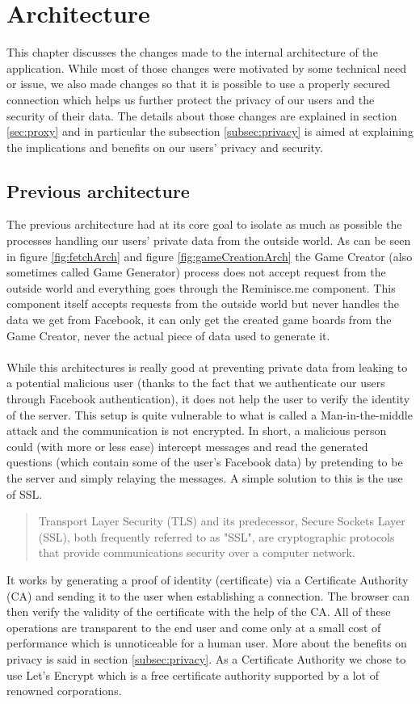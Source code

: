 \chapter{Architecture}
This chapter discusses the changes made to the internal architecture of the application. While most of those changes were motivated by some technical need or issue, we also made changes so that it is possible to use a properly secured connection which helps us further protect the privacy of our users and the security of their data. The details about those changes are explained in section \ref{sec:proxy} and in particular the subsection \ref{subsec:privacy} is aimed at explaining the implications and benefits on our users' privacy and security.
\section{Previous architecture}
The previous architecture had at its core goal to isolate as much as possible the processes handling our users' private data from the outside world. As can be seen in figure \ref{fig:fetchArch} and figure \ref{fig:gameCreationArch} the Game Creator (also sometimes called Game Generator) process does not accept request from the outside world and everything goes through the Reminisce.me component. This component itself accepts requests from the outside world but never handles the data we get from Facebook, it can only get the created game boards from the Game Creator, never the actual piece of data used to generate it.\\\\
While this architectures is really good at preventing private data from leaking to a potential malicious user (thanks to the fact that we authenticate our users through Facebook authentication), it does not help the user to verify the identity of the server. This setup is quite vulnerable to what is called a Man-in-the-middle attack\cite{mitm} and the communication is not encrypted. In short, a malicious person could (with more or less ease) intercept messages and read the generated questions (which contain some of the user's Facebook data) by pretending to be the server and simply relaying the messages.
A simple solution to this is the use of SSL\cite{whyssl}.\blockquote{Transport Layer Security (TLS) and its predecessor, Secure Sockets Layer (SSL), both frequently referred to as "SSL", are cryptographic protocols that provide communications security over a computer network.\cite{ssl}}
It works by generating a proof of identity (certificate) via a Certificate Authority\cite{ca} (CA) and sending it to the user when establishing a connection. The browser can then verify the validity of the certificate with the help of the CA. All of these operations are transparent to the end user and come only at a small cost of performance which is unnoticeable for a human user. More about the benefits on privacy is said in section \ref{subsec:privacy}. As a Certificate Authority we chose to use Let's Encrypt\cite{letsencrypt} which is a free certificate authority supported by a lot of renowned corporations.

